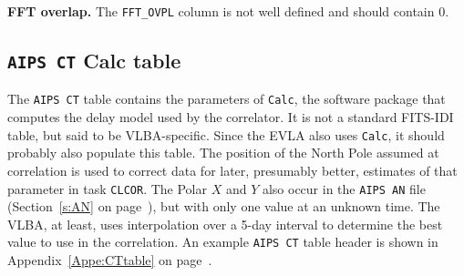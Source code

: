 \documentclass[twoside]{article}
\begin{document}
{\bf FFT overlap.}  The {\tt FFT\_OVPL} column is not well defined and
should contain 0.

\vfill\eject
\subsection{{\tt AIPS CT} Calc table}
\label{s:CT}

The {\tt AIPS CT} table contains the parameters of {\tt Calc}, the
software package that computes the delay model used by the correlator.
It is not a standard FITS-IDI table, but said to be VLBA-specific.
Since the EVLA also uses {\tt Calc}, it should probably also populate
this table.  The position of the North Pole assumed at correlation is
used to correct data for later, presumably better, estimates of that
parameter in task {\tt CLCOR}\@.  The Polar $X$ and $Y$ also occur in
the {\tt AIPS AN} file (Section~\ref{s:AN} on page~\pageref{s:AN}),
but with only one value at an unknown time.  The VLBA, at least, uses
interpolation over a 5-day interval to determine the best value to use
in the correlation.  An example {\tt AIPS CT} table header is
shown in Appendix~\ref{Appe:CTtable} on page~\pageref{Appe:CTtable}.
\end{document}
